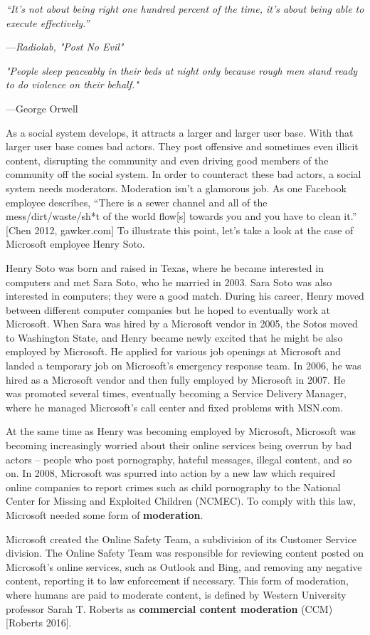 \documentclass[class=book, crop=false]{standalone}
\providecommand{\keyterm}[1]{\textbf{#1}\marginnote{\scriptsize \textbf{#1}}}
\begin{document}
\epigraph{\itshape “It’s not about being right one hundred percent of the time, it’s about being able to execute effectively.”}{---\textit{Radiolab, "Post No Evil"}}

\epigraph{\itshape "People sleep peaceably in their beds at night only because rough men stand ready to do violence on their behalf."}{---George Orwell}

As a social system develops, it attracts a larger and larger user base. With that larger user base comes bad actors. They post offensive and sometimes even illicit content, disrupting the community and even driving good members of the community off the social system. In order to counteract these bad actors, a social system needs moderators. Moderation isn't a glamorous job. As one Facebook employee describes, “There is a sewer channel and all of the mess/dirt/waste/sh*t of the world flow[s] towards you and you have to clean it.” [Chen 2012, gawker.com] To illustrate this point, let's take a look at the case of Microsoft employee Henry Soto.

Henry Soto was born and raised in Texas, where he became interested in computers and met Sara Soto, who he married in 2003. Sara Soto was also interested in computers; they were a good match. During his career, Henry moved between different computer companies but he hoped to eventually work at Microsoft. When Sara was hired by a Microsoft vendor in 2005, the Sotos moved to Washington State, and Henry became newly excited that he might be also employed by Microsoft. He applied for various job openings at Microsoft and landed a temporary job on Microsoft's emergency response team. In 2006, he was hired as a Microsoft vendor and then fully employed by Microsoft in 2007. He was promoted several times, eventually becoming a Service Delivery Manager, where he managed Microsoft's call center and fixed problems with MSN.com.

At the same time as Henry was becoming employed by Microsoft, Microsoft was becoming increasingly worried about their online services being overrun by bad actors -- people who post pornography, hateful messages, illegal content, and so on. In 2008, Microsoft was spurred into action by a new law which required online companies to report crimes such as child pornography to the National Center for Missing and Exploited Children (NCMEC). To comply with this law, Microsoft needed some form of \keyterm{moderation}.

Microsoft created the Online Safety Team, a subdivision of its Customer Service division. The Online Safety Team was responsible for reviewing content posted on Microsoft's online services, such as Outlook and Bing, and removing any negative content, reporting it to law enforcement if necessary. This form of moderation, where humans are paid to moderate content, is defined by Western University professor Sarah T. Roberts as \keyterm{commercial content moderation} (CCM) [Roberts 2016].
\end{document}
